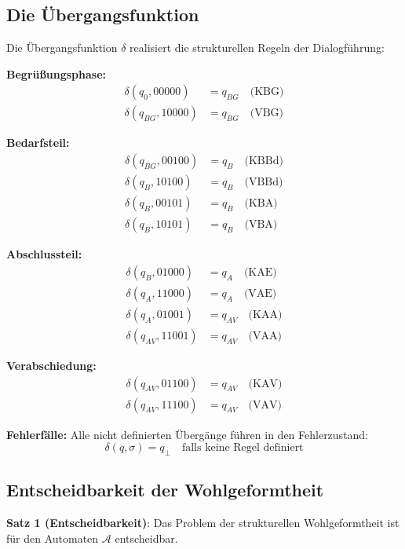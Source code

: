 \documentclass[
  12pt,
  a4paper,
  oneside,
  titlepage
]{article}
\begin{document}
\subsection{Die Übergangsfunktion}

Die Übergangsfunktion \(\delta\) realisiert die strukturellen Regeln 
der Dialogführung:

\textbf{Begrüßungsphase:}
\begin{align*}
\delta(q_0, 00000) &= q_{BG} \quad \text{(KBG)} \\
\delta(q_{BG}, 10000) &= q_{BG} \quad \text{(VBG)}
\end{align*}

\textbf{Bedarfsteil:}
\begin{align*}
\delta(q_{BG}, 00100) &= q_B \quad \text{(KBBd)} \\
\delta(q_B, 10100) &= q_B \quad \text{(VBBd)} \\
\delta(q_B, 00101) &= q_B \quad \text{(KBA)} \\
\delta(q_B, 10101) &= q_B \quad \text{(VBA)}
\end{align*}

\textbf{Abschlussteil:}
\begin{align*}
\delta(q_B, 01000) &= q_A \quad \text{(KAE)} \\
\delta(q_A, 11000) &= q_A \quad \text{(VAE)} \\
\delta(q_A, 01001) &= q_{AV} \quad \text{(KAA)} \\
\delta(q_{AV}, 11001) &= q_{AV} \quad \text{(VAA)}
\end{align*}

\textbf{Verabschiedung:}
\begin{align*}
\delta(q_{AV}, 01100) &= q_{AV} \quad \text{(KAV)} \\
\delta(q_{AV}, 11100) &= q_{AV} \quad \text{(VAV)}
\end{align*}

\textbf{Fehlerfälle:}
Alle nicht definierten Übergänge führen in den Fehlerzustand:
\[
\delta(q, \sigma) = q_\bot \quad \text{falls keine Regel definiert}
\]

\subsection{Entscheidbarkeit der Wohlgeformtheit}

\textbf{Satz 1 (Entscheidbarkeit)}: 
Das Problem der strukturellen Wohlgeformtheit ist für den Automaten 
\(\mathcal{A}\) entscheidbar.
\end{document}
